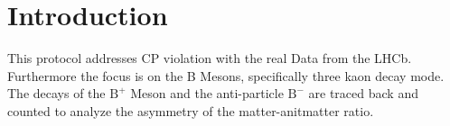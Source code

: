 \section{Introduction}
\label{sec:intro}
This protocol addresses CP violation with the real Data from the LHCb. Furthermore the focus is on the B Mesons, specifically three kaon decay mode. The decays of the $\text{B}^+$ Meson and the anti-particle $\text{B}^-$ are traced back and counted to analyze the asymmetry of the matter-anitmatter ratio.
